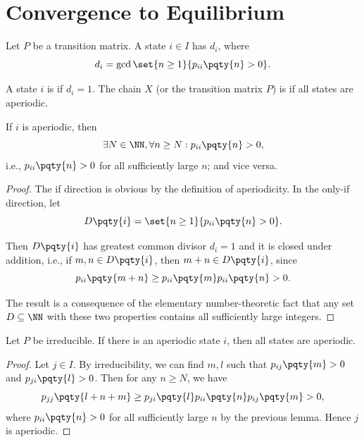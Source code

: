 \section{Convergence to Equilibrium}

\begin{definition}[Periodicity]
    Let \(P\) be a transition matrix. A state \(i \in I\) has  \(d_i\), where
    \[
        d_i = \gcd \set{n \geq 1}{p_{i i} \pqty{n} > 0}.
    \]

    A state \(i\) is  if \(d_i = 1\). The chain \(X\) (or the transition matrix \(P\)) is  if all states are aperiodic.
\end{definition}

\begin{lemma}
    If \(i\) is aperiodic, then
    \[
        \exists N \in \NN, \forall n \geq N: p_{i i} \pqty{n} > 0,
    \]
    i.e., \(p_{ii} \pqty{n} > 0\) for all sufficiently large \(n\); and vice versa.
\end{lemma}

\begin{proof}
    The if direction is obvious by the definition of aperiodicity. In the only-if direction, let
    \[
        D\pqty{i} = \set{n \geq 1}{p_{i i} \pqty{n} > 0}.
    \]

    Then \(D\pqty{i}\) has greatest common divisor \(d_i = 1\) and it is closed under addition, i.e., if \(m, n \in D\pqty{i}\), then \(m + n \in D\pqty{i}\), since
    \[
        p_{i i} \pqty{m + n} \geq p_{i i} \pqty{m} p_{i i} \pqty{n} > 0.
    \]

    The result is a consequence of the elementary number-theoretic fact that any set \(D \subseteq \NN\) with these two properties contains all sufficiently large integers.
\end{proof}

\begin{lemma}
    Let \(P\) be irreducible. If there is an aperiodic state \(i\), then all states are aperiodic.
\end{lemma}

\begin{proof}
    Let \(j \in I\). By irreducibility, we can find \(m, l\) such that \(p_{i j} \pqty{m} > 0\) and \(p_{j i} \pqty{l} > 0\). Then for any \(n \geq N\), we have
    \[
        p_{jj} \pqty{l + n + m} \geq p_{ji} \pqty{l} p_{ii} \pqty{n} p_{ij} \pqty{m} > 0,
    \]
    where \(p_{ii} \pqty{n} > 0\) for all sufficiently large \(n\) by the previous lemma. Hence \(j\) is aperiodic.
\end{proof}

